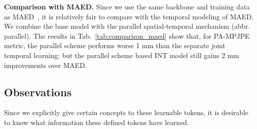 \begin{table*}[!htbp]\small
	\caption{Comparisons with the temporal modeling of MAED. We report the MAED result we reproduced.}
	\label{tab:comparison_maed}
	\centering




\end{table*}

{\bf Comparison with MAED.} Since we use the same backbone and training data as MAED~\citep{maed:wan2021encoder}, it is relatively fair to compare with the temporal modeling of MAED. We combine the base model with the parallel spatial-temporal mechanism (abbr. parallel). The results in Tab.~\ref{tab:comparison_maed} show that, for PA-MPJPE metric, the parallel scheme performs worse 1 mm than the separate joint temporal learning; but the parallel scheme based INT model still gains 2 mm improvements over MAED.







\subsection{Observations}


Since we explicitly give certain concepts to these learnable tokens, it is desirable to know what information these defined tokens have learned. 


